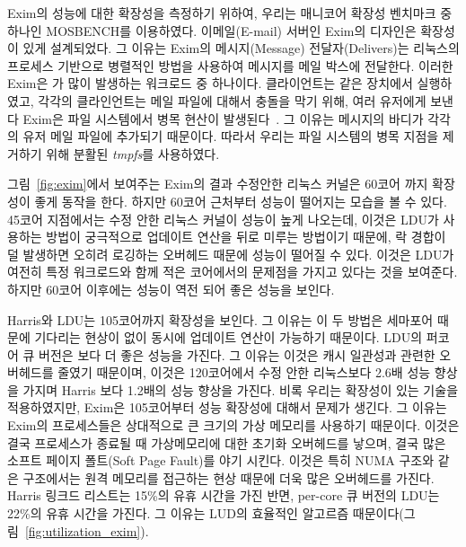 Exim의 성능에 대한 확장성을 측정하기 위하여, 우리는 매니코어 확장성 벤치마크 중 하나인 MOSBENCH를 이용하였다. 
이메일(E-mail) 서버인 Exim의 디자인은 확장성이 있게 설계되었다. 
그 이유는 Exim의 메시지(Message) 전달자(Delivers)는 리눅스의 프로세스 기반으로 
병렬적인 방법을 사용하여 메시지를 메일 박스에 전달한다.
이러한 Exim은 가 많이 발생하는 워크로드 중 하나이다. 
클라이언트는 같은 장치에서 실행하였고, 
각각의 클라인언트는 메일 파일에 대해서 충돌을 막기 위해, 여러 유저에게 보낸다 
Exim은 파일 시스템에서 병목 현산이 발생된다~\cite{SilasBoydWickizer2010LinuxScales48}.
그 이유는 메시지의 바디가 각각의 유저 메일 파일에 추가되기 때문이다.
따라서 우리는 파일 시스템의 병목 지점을 제거하기 위해 분활된 \textit{tmpfs}를 사용하였다. 

그림~\ref{fig:exim}에서 보여주는 Exim의 결과 수정안한 리눅스 커널은 
60코어 까지 확장성이 좋게 동작을 한다. 
하지만 60코어 근처부터 성능이 떨어지는 모습을 볼 수 있다.
45코어 지점에서는 수정 안한 리눅스 커널이 성능이 높게 나오는데, 이것은 LDU가 사용하는 방법이 
궁극적으로 업데이트 연산을 뒤로 미루는 방법이기 때문에, 락 경합이 덜 발생하면 오히려 로깅하는 오버헤드 때문에 
성능이 떨어질 수 있다. 
이것은 LDU가 여전히 특정 워크로드와 함께 적은 코어에서의 문제점을 가지고 있다는 것을 보여준다.
하지만 60코어 이후에는 성능이 역전 되어 좋은 성능을 보인다. 

Harris와 LDU는 105코어까지 확장성을 보인다. 
그 이유는 이 두 방법은 세마포어 때문에 기다리는 현상이 없이 동시에 업데이트 연산이 가능하기 때문이다. 
LDU의 퍼코어 큐 버전은 보다 더 좋은 성능을 가진다.
그 이유는 이것은 캐시 일관성과 관련한 오버헤드를 줄였기 때문이며, 이것은 120코어에서 수정 안한 
리눅스보다 2.6배 성능 향상을 가지며 Harris 보다 1.2배의 성능 향상을 가진다.
비록 우리는 확장성이 있는 기술을 적용하였지만, Exim은 105코어부터 성능 확장성에 대해서 문제가 생긴다.
그 이유는 Exim의 프로세스들은 상대적으로 큰 크기의 가상 메모리를 사용하기 때문이다.
이것은 결국 프로세스가 종료될 때 가상메모리에 대한 초기화 오버헤드를 낳으며,
결국 많은 소프트 페이지 폴트(Soft Page Fault)를 야기 시킨다. 
이것은 특히 NUMA 구조와 같은 구조에서는 원격 메모리를 접근하는 현상 때문에 더욱 많은 오버헤드를 가진다.
Harris 링크드 리스트는 15\%의 유휴 시간을 가진 반면, per-core 큐 버전의 LDU는 22\%의 유휴 시간을 가진다.
그 이유는 LUD의 효율적인 알고르즘 때문이다(그림~\ref{fig:utilization_exim}).

